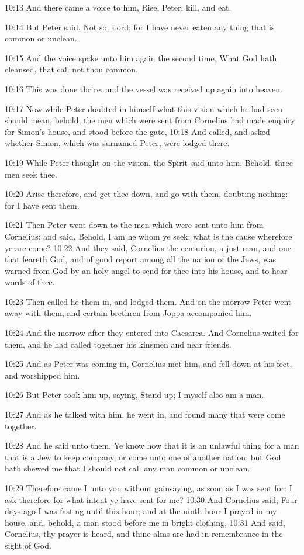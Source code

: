 10:13 And there came a voice to him, Rise, Peter; kill, and eat.

10:14 But Peter said, Not so, Lord; for I have never eaten any thing that is common or unclean.

10:15 And the voice spake unto him again the second time, What God hath cleansed, that call not thou common.

10:16 This was done thrice: and the vessel was received up again into heaven.

10:17 Now while Peter doubted in himself what this vision which he had seen should mean, behold, the men which were sent from Cornelius had made enquiry for Simon's house, and stood before the gate, 10:18 And called, and asked whether Simon, which was surnamed Peter, were lodged there.

10:19 While Peter thought on the vision, the Spirit said unto him, Behold, three men seek thee.

10:20 Arise therefore, and get thee down, and go with them, doubting nothing: for I have sent them.

10:21 Then Peter went down to the men which were sent unto him from Cornelius; and said, Behold, I am he whom ye seek: what is the cause wherefore ye are come?  10:22 And they said, Cornelius the centurion, a just man, and one that feareth God, and of good report among all the nation of the Jews, was warned from God by an holy angel to send for thee into his house, and to hear words of thee.

10:23 Then called he them in, and lodged them. And on the morrow Peter went away with them, and certain brethren from Joppa accompanied him.

10:24 And the morrow after they entered into Caesarea. And Cornelius waited for them, and he had called together his kinsmen and near friends.

10:25 And as Peter was coming in, Cornelius met him, and fell down at his feet, and worshipped him.

10:26 But Peter took him up, saying, Stand up; I myself also am a man.

10:27 And as he talked with him, he went in, and found many that were come together.

10:28 And he said unto them, Ye know how that it is an unlawful thing for a man that is a Jew to keep company, or come unto one of another nation; but God hath shewed me that I should not call any man common or unclean.

10:29 Therefore came I unto you without gainsaying, as soon as I was sent for: I ask therefore for what intent ye have sent for me?  10:30 And Cornelius said, Four days ago I was fasting until this hour; and at the ninth hour I prayed in my house, and, behold, a man stood before me in bright clothing, 10:31 And said, Cornelius, thy prayer is heard, and thine alms are had in remembrance in the sight of God.

